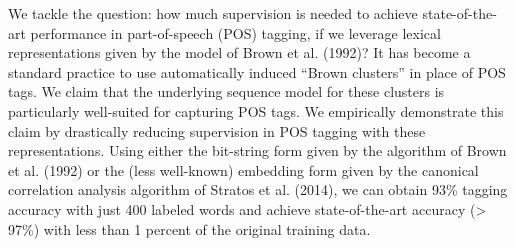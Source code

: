We tackle the question: how much supervision is needed to achieve state-of-the-art performance in part-of-speech (POS) tagging, if we leverage lexical representations given by the model of Brown et al. (1992)? It has become a standard practice to use automatically induced ``Brown clusters'' in place of POS tags. We claim that the underlying sequence model for these clusters is particularly well-suited for capturing POS tags. We empirically demonstrate this claim by drastically reducing supervision in POS tagging with these representations. Using either the bit-string form given by the algorithm of Brown et al. (1992) or the (less well-known) embedding form given by the canonical correlation analysis algorithm of Stratos et al. (2014), we can obtain 93\% tagging accuracy with just 400 labeled words and achieve state-of-the-art accuracy (> 97\%) with less than 1 percent of the original training data.
